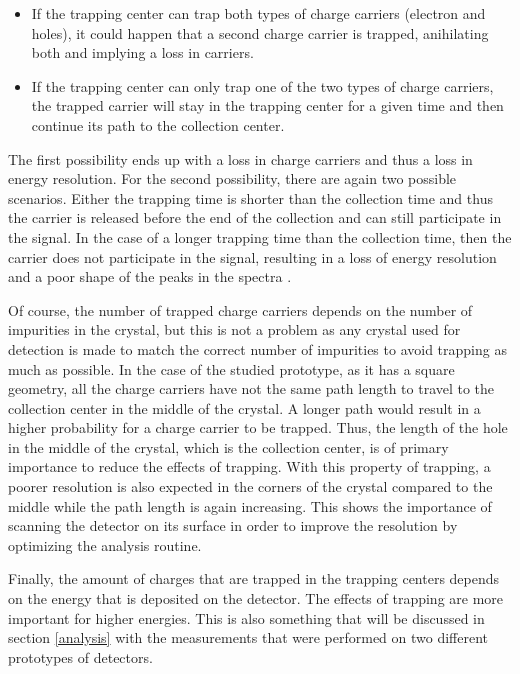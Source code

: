 \documentclass[11pt,a4paper]{article}
\begin{document}
\begin{itemize}
\item If the trapping center can trap both types of charge carriers (electron and holes), it could happen that a second charge carrier is trapped, anihilating both and implying a loss in carriers.
\item If the trapping center can only trap one of the two types of charge carriers, the trapped carrier will stay in the trapping center for a given time and then continue its path to the collection center.
\end{itemize}
The first possibility ends up with a loss in charge carriers and thus a loss in energy resolution. For the second possibility, there are again two possible scenarios. Either the trapping time is shorter than the collection time and thus the carrier is released before the end of the collection and can still participate in the signal. In the case of a longer trapping time than the collection time, then the carrier does not participate in the signal, resulting in a loss of energy resolution and a poor shape of the peaks in the spectra \cite{Tsoulfanidis}.

Of course, the number of trapped charge carriers depends on the number of impurities in the crystal, but this is not a problem as any crystal used for detection is made to match the correct number of impurities to avoid trapping as much as possible. In the case of the studied prototype, as it has a square geometry, all the charge carriers have not the same path length to travel to the collection center in the middle of the crystal. A longer path would result in a higher probability for a charge carrier to be trapped. Thus, the length of the hole in the middle of the crystal, which is the collection center, is of primary importance to reduce the effects of trapping. With this property of trapping, a poorer resolution is also expected in the corners of the crystal compared to the middle while the path length is again increasing. This shows the importance of scanning the detector on its surface in order to improve the resolution by optimizing the analysis routine.

Finally, the amount of charges that are trapped in the trapping centers depends on the energy that is deposited on the detector. The effects of trapping are more important for higher energies. This is also something that will be discussed in section \ref{analysis} with the measurements that were performed on two different prototypes of detectors.
\end{document}
